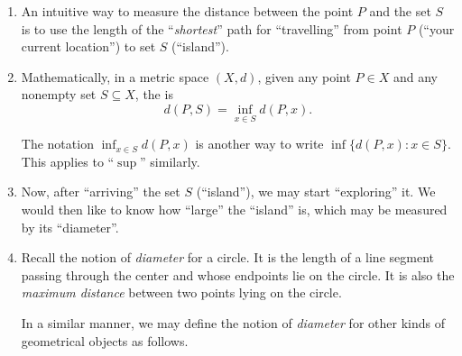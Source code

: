 \begin{enumerate}
\item An intuitive way to measure the distance between the point \(P\) and the
set \(S\) is to use the length of the ``\emph{shortest}'' path for ``travelling''
from point \(P\) (``your current location'') to set \(S\) (``island'').
\begin{center}
\end{center}
\item Mathematically, in a metric space \((X,d)\), given any point \(P\in X\)
and any nonempty set \(S\subseteq X\), the  is
\[
d(P,S)=\inf_{x\in S}d(P,x).
\]
\begin{note}
The notation \(\displaystyle \inf_{x\in S}d(P,x)\) is another way to write
\(\inf\{d(P,x):x\in S\}\). This applies to ``\(\sup\)'' similarly.
\end{note}
\item Now, after ``arriving'' the set \(S\) (``island''), we may start
``exploring''  it. We would then like to know how ``large'' the
``island'' is, which may be measured by its ``diameter''.
\begin{center}
\end{center}
\item Recall the notion of \emph{diameter} for a circle. It is the length of a
line segment passing through the center and whose endpoints lie on the circle.
It is also the \emph{maximum distance} between two points lying on the circle.
\begin{center}
\end{center}
In a similar manner, we may define the notion of \emph{diameter} for other
kinds of geometrical objects as follows.


\end{enumerate}
